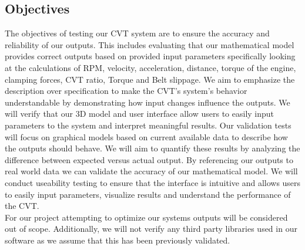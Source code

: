 \documentclass[12pt, titlepage]{article}
\begin{document}
\subsection{Objectives}




\noindent The objectives of testing our CVT system are to ensure the accuracy and reliability of our outputs. 
This includes evaluating that our mathematical model provides correct outputs based on provided input parameters specifically looking at the calculations of RPM, velocity, acceleration, distance, torque of the engine, clamping forces, CVT ratio, Torque and Belt slippage. 
We aim to emphasize the description over specification to make the CVT's system's behavior understandable by demonstrating how input changes influence the outputs.
We will verify that our 3D model and user interface allow users to easily input parameters to the system and interpret meaningful results. 
Our validation tests will focus on graphical models based on current available data to describe how the outputs should behave. 
We will aim to quantify these results by analyzing the difference between expected versus actual output. 
By referencing our outputs to real world data we can validate the accuracy of our mathematical model.
We will conduct useability testing to ensure that the interface is intuitive and allows users to easily input parameters, visualize results and understand the performance of the CVT.
\\
\noindent For our project attempting to optimize our systems outputs will be considered out of scope. 
Additionally, we will not verify any third party libraries used in our software as we assume that this has been previously validated. 
\end{document}
